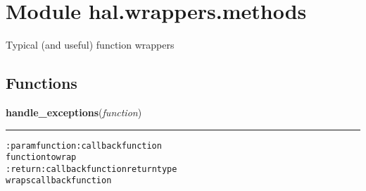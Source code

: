 %
%
%


\section{Module hal.wrappers.methods}

    \label{hal:wrappers:methods}
Typical (and useful) function wrappers



  \subsection{Functions}

    \label{hal:wrappers:methods:handle_exceptions}

    \vspace{0.5ex}

\hspace{.8\funcindent}\begin{boxedminipage}{\funcwidth}

    \raggedright \textbf{handle\_exceptions}(\textit{function})

    \vspace{-1.5ex}

    \rule{\textwidth}{0.5\fboxrule}
\setlength{\parskip}{2ex}
\begin{alltt}

:param function: callback function
    function to wrap
:return: callback function return type
    wraps callback function
\end{alltt}

\setlength{\parskip}{1ex}
    \end{boxedminipage}

